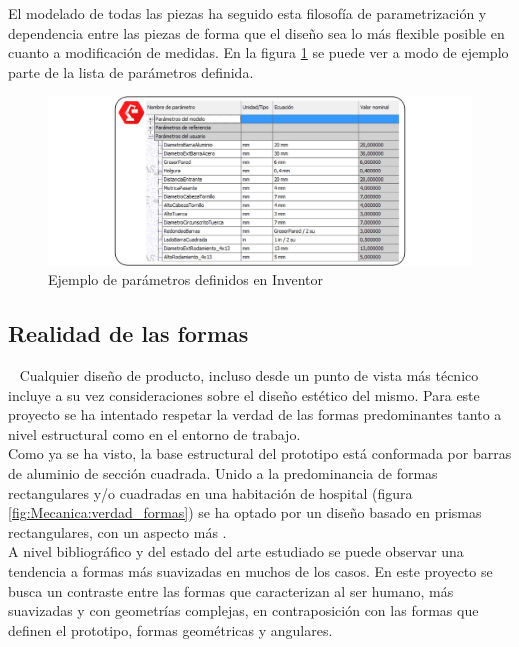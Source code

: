     El modelado de todas las piezas ha seguido esta filosofía de parametrización y dependencia entre las piezas de forma que el diseño sea lo más flexible posible en cuanto a modificación de medidas. En la figura \ref{fig:Mecanica:diseno_parametrico} se puede ver a modo de ejemplo parte de la lista de parámetros definida.

    \begin{figure}[H]
        \centering
        \includegraphics[width=\textwidth]{figuras/Imagenes_Mecanica/diseno_parametrico.jpg}
        \caption{Ejemplo de parámetros definidos en Inventor}
        \label{fig:Mecanica:diseno_parametrico}
    \end{figure}

\subsection{Realidad de las formas}
    Cualquier diseño de producto, incluso desde un punto de vista más técnico incluye a su vez consideraciones sobre el diseño estético del mismo. Para este proyecto se ha intentado respetar la verdad de las formas predominantes tanto a nivel estructural como en el entorno de trabajo.
    \\

    Como ya se ha visto, la base estructural del prototipo está conformada por barras de aluminio de sección cuadrada. Unido a la predominancia de formas rectangulares y/o cuadradas en una habitación de hospital (figura \ref{fig:Mecanica:verdad_formas}) se ha optado por un diseño basado en prismas rectangulares, con un aspecto más .
    \\

    A nivel bibliográfico y del estado del arte estudiado se puede observar una tendencia a formas más suavizadas en muchos de los casos. En este proyecto se busca un contraste entre las formas que caracterizan al ser humano, más suavizadas y con geometrías complejas, en contraposición con las formas que definen el prototipo, formas geométricas y angulares.

